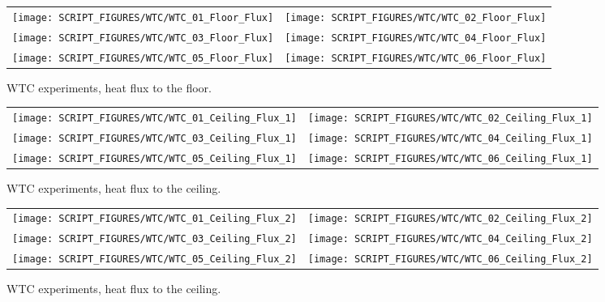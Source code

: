 \newpage

\begin{figure}[p]
\begin{tabular*}{\textwidth}{l@{\extracolsep{\fill}}r}
\texttt{[image: SCRIPT\_FIGURES/WTC/WTC\_01\_Floor\_Flux]} &
\texttt{[image: SCRIPT\_FIGURES/WTC/WTC\_02\_Floor\_Flux]} \\
\texttt{[image: SCRIPT\_FIGURES/WTC/WTC\_03\_Floor\_Flux]} &
\texttt{[image: SCRIPT\_FIGURES/WTC/WTC\_04\_Floor\_Flux]} \\
\texttt{[image: SCRIPT\_FIGURES/WTC/WTC\_05\_Floor\_Flux]} &
\texttt{[image: SCRIPT\_FIGURES/WTC/WTC\_06\_Floor\_Flux]}
\end{tabular*}
\caption[WTC experiments, heat flux to the floor]{WTC experiments, heat flux to the floor.}
\label{NIST_WTC_Floor_Flux}
\end{figure}

\begin{figure}[p]
\begin{tabular*}{\textwidth}{l@{\extracolsep{\fill}}r}
\texttt{[image: SCRIPT\_FIGURES/WTC/WTC\_01\_Ceiling\_Flux\_1]} &
\texttt{[image: SCRIPT\_FIGURES/WTC/WTC\_02\_Ceiling\_Flux\_1]} \\
\texttt{[image: SCRIPT\_FIGURES/WTC/WTC\_03\_Ceiling\_Flux\_1]} &
\texttt{[image: SCRIPT\_FIGURES/WTC/WTC\_04\_Ceiling\_Flux\_1]} \\
\texttt{[image: SCRIPT\_FIGURES/WTC/WTC\_05\_Ceiling\_Flux\_1]} &
\texttt{[image: SCRIPT\_FIGURES/WTC/WTC\_06\_Ceiling\_Flux\_1]}
\end{tabular*}
\caption[WTC experiments, heat flux to the ceiling]{WTC experiments, heat flux to the ceiling.}
\label{NIST_WTC_Ceiling_Flux_1}
\end{figure}

\begin{figure}[p]
\begin{tabular*}{\textwidth}{l@{\extracolsep{\fill}}r}
\texttt{[image: SCRIPT\_FIGURES/WTC/WTC\_01\_Ceiling\_Flux\_2]} &
\texttt{[image: SCRIPT\_FIGURES/WTC/WTC\_02\_Ceiling\_Flux\_2]} \\
\texttt{[image: SCRIPT\_FIGURES/WTC/WTC\_03\_Ceiling\_Flux\_2]} &
\texttt{[image: SCRIPT\_FIGURES/WTC/WTC\_04\_Ceiling\_Flux\_2]} \\
\texttt{[image: SCRIPT\_FIGURES/WTC/WTC\_05\_Ceiling\_Flux\_2]} &
\texttt{[image: SCRIPT\_FIGURES/WTC/WTC\_06\_Ceiling\_Flux\_2]}
\end{tabular*}
\caption[WTC experiments, heat flux to the ceiling]{WTC experiments, heat flux to the ceiling.}
\label{NIST_WTC_Ceiling_Flux_2}
\end{figure}



